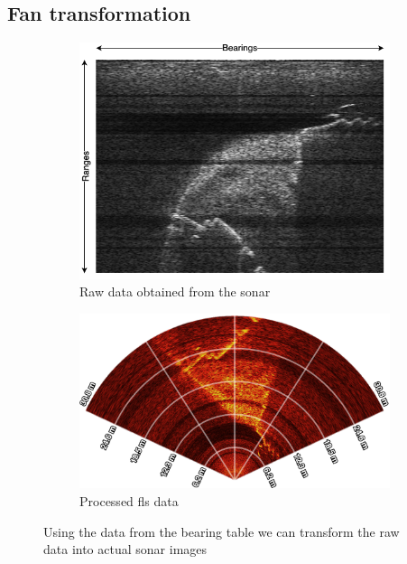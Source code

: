 \subsection{Fan transformation}
\label{sec:fan-tform}
\begin{figure}[H]
    \centering
    \begin{subfigure}[b]{.45\textwidth}
        \centering
        \includegraphics[width=\textwidth]{figures/sonar_raw_annotated.png}
        \caption[\acrshort{fls} raw data]{Raw data obtained from the sonar}
        \label{sfig:sonarraw}
    \end{subfigure}
    \hfill
    \begin{subfigure}[b]{.45\textwidth}
        \centering
        \includegraphics[width=\textwidth]{figures/sonar_processed.png}
        \caption{Processed \acrshort{fls} data}
        \label{sfig:sonarfan}
    \end{subfigure}
    \caption{Using the data from the bearing table we can transform the raw data into actual sonar images}
\end{figure}

